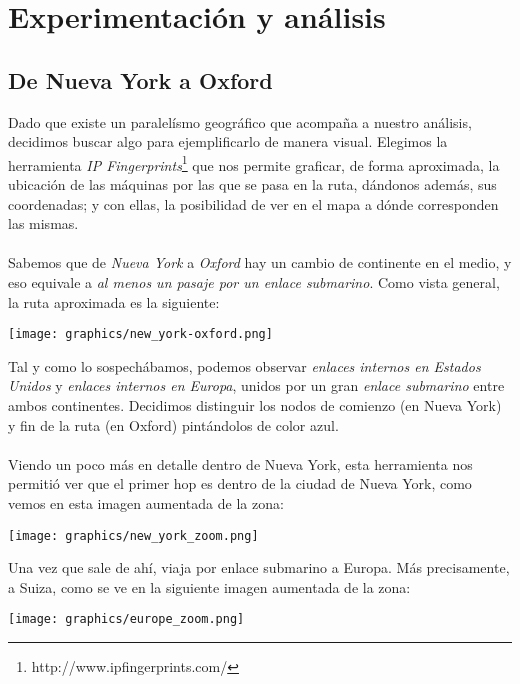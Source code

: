 \section{Experimentación y análisis}

\subsection{De Nueva York a Oxford}

Dado que existe un paralelísmo geográfico que acompaña a nuestro análisis, decidimos buscar algo para ejemplificarlo de manera visual. Elegimos la herramienta \textit{IP Fingerprints}\footnote{http://www.ipfingerprints.com/} que nos permite graficar, de forma aproximada, la ubicación de las máquinas por las que se pasa en la ruta, dándonos además, sus coordenadas; y con ellas, la posibilidad de ver en el mapa a dónde corresponden las mismas.\\
\\
\indent Sabemos que de \textit{Nueva York} a \textit{Oxford} hay un cambio de continente en el medio, y eso equivale a \textit{al menos un pasaje por un enlace submarino}. Como vista general, la ruta aproximada es la siguiente:
\begin{center}
	\texttt{[image: graphics/new\_york-oxford.png]}
\end{center}

Tal y como lo sospechábamos, podemos observar \textit{enlaces internos en Estados Unidos} y \textit{enlaces internos en Europa}, unidos por un gran \textit{enlace submarino} entre ambos continentes. Decidimos distinguir los nodos de comienzo (en Nueva York) y fin de la ruta (en Oxford) pintándolos de color azul.\\
\\
\indent Viendo un poco más en detalle dentro de Nueva York, esta herramienta nos permitió ver que el primer hop es dentro de la ciudad de Nueva York, como vemos en esta imagen aumentada de la zona:

\begin{center}
	\texttt{[image: graphics/new\_york\_zoom.png]}
\end{center}

Una vez que sale de ahí, viaja por enlace submarino a Europa. Más precisamente, a Suiza, como se ve en la siguiente imagen aumentada de la zona:

\begin{center}
	\texttt{[image: graphics/europe\_zoom.png]}
\end{center}

